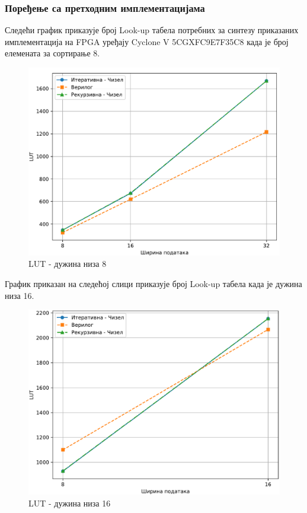 \documentclass[12pt, a4paper]{article}
\theoremstyle{definition}
\begin{document}
\subsubsection{Поређење са претходним имплементацијама}
Следећи график приказује број Look-up табела потребних за синтезу приказаних имплементација на FPGA уређају Cyclone V 5CGXFC9E7F35C8 када је број елемената за сортирање 8.
\begin{figure}[H]
  \centering
      \includegraphics[scale=0.22]{slike/lut8}
  \caption{LUT - дужина низа 8}
  \label{fig:LUT8}
\end{figure}

График приказан на следећој слици приказује број Look-up табела када је дужина низа 16.
\begin{figure}[H]
  \centering
      \includegraphics[scale=0.22]{slike/lut16}
  \caption{LUT - дужина низа 16}
  \label{fig:LUT16}
\end{figure}
\end{document}
